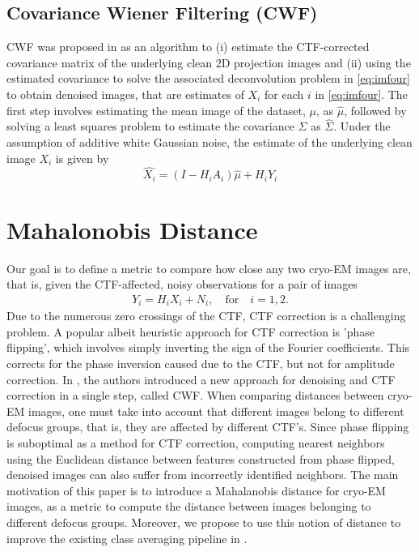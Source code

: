\documentclass{article}
\begin{document}
\subsection{Covariance Wiener Filtering (CWF)}
CWF was proposed in \cite{cwf} as an algorithm to (i) estimate the CTF-corrected covariance matrix of the underlying clean 2D projection images and (ii) using the estimated covariance to solve the associated deconvolution problem in \ref{eq:imfour} to obtain denoised images, that are estimates of $X_i$ for each $i$ in 
\ref{eq:imfour}. The first step involves estimating the mean image of the dataset, $\mu$, as $\hat{\mu}$, followed by solving a least squares problem to estimate the covariance $\Sigma$ as $\hat{\Sigma}$. Under the assumption of additive white Gaussian noise, the estimate of the underlying clean image $X_i$ is given by
\begin{equation}
\hat{X_i}=(I-H_iA_i)\hat{\mu} + H_iY_i
\end{equation}
%
\section{Mahalonobis Distance}
Our goal is to define a metric to compare how close any two cryo-EM images are, that is, given the CTF-affected, noisy observations for a pair of images
\begin{eqnarray} 
Y_i=H_i X_i + N_i, \quad \text{for} \quad i=1,2 .
\end{eqnarray}
Due to the numerous zero crossings of the CTF, CTF correction is a challenging problem. A popular albeit heuristic approach for CTF correction is 'phase flipping', which involves simply inverting the sign of the Fourier coefficients. This corrects for the phase inversion caused due to the CTF, but not for amplitude correction. In \cite{cwf}, the authors introduced a new approach for denoising and CTF correction in a single step, called CWF. When comparing distances between cryo-EM images, one must take into account that different images belong to different defocus groups, that is, they are affected by different CTF's. Since phase flipping is suboptimal as a method for CTF correction, computing nearest neighbors using the Euclidean distance between features constructed from phase flipped, denoised images can also suffer from incorrectly identified neighbors. The main motivation of this paper is to introduce a Mahalanobis distance for cryo-EM images, as a metric to compute the distance between images belonging to different defocus groups. Moreover, we propose to use this notion of distance to improve the existing class averaging pipeline in \cite{zhao1}.
\end{document}
